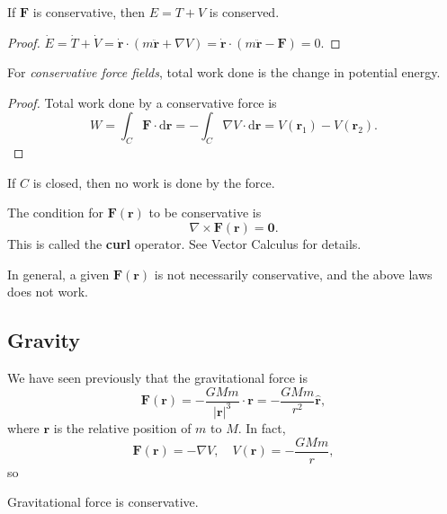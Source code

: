 \begin{proposition}
    If $\mathbf{F}$ is conservative, then $ E=T+V $ is conserved.
\end{proposition}
\begin{proof}
    $ \dot{E}=\dot{T}+\dot{V} = \dot{\mathbf{r}}\cdot(m  \ddot{\mathbf{r}}+ \nabla V)=\dot{\mathbf{r}}\cdot(m  \ddot{\mathbf{r}}-\mathbf{F})=0$.
\end{proof}
\begin{proposition}
    For \textit{conservative force fields}, total work done is the change in potential energy.
\end{proposition}
\begin{proof}
    Total work done by a conservative force is 
    \[
        W = \int_{C} \mathbf{F} \cdot\mathrm{d}\mathbf{r} = -\int_{C} \nabla V \cdot\mathrm{d}\mathbf{r} = V(\mathbf{r}_1)-V(\mathbf{r}_2).
    \]
\end{proof}
\begin{corollary}
    If $C$ is closed, then no work is done by the force.
\end{corollary}
\begin{note}
    The condition for $ \mathbf{F}(\mathbf{r}) $ to be conservative is 
    \[
        \nabla \times \mathbf{F}(\mathbf{r}) = \mathbf{0}.
    \]
    This is called the \textbf{curl} operator. See Vector Calculus for details.
\end{note}
\begin{remark}
    In general, a given $ \mathbf{F}(\mathbf{r}) $ is not necessarily conservative, and the above laws does not work.
\end{remark}

\subsection{Gravity}
We have seen previously that the gravitational force is 
\[
    \mathbf{F}(\mathbf{r}) = -\frac{GMm}{|\mathbf{r}|^3}\cdot \mathbf{r} = -\frac{GMm}{r^2}\hat{\mathbf{r}},
\]
where $\mathbf{r}$ is the relative position of $m$ to $M$. In fact, 
\[
    \mathbf{F}(\mathbf{r}) = - \nabla V,\quad V(\mathbf{r}) = -\frac{GMm}{r},
\]
so
\begin{proposition}
    Gravitational force is conservative.
\end{proposition}

